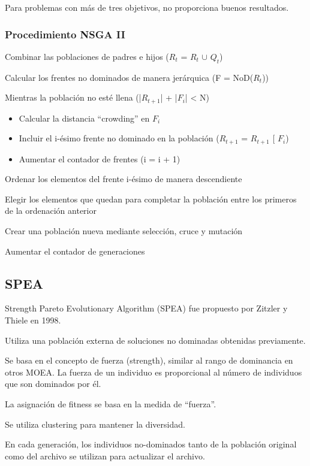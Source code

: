 \documentclass[12pt, twoside, openright]{report} %
\begin{document}
Para problemas con más de tres objetivos, no proporciona buenos resultados.

\subsubsection{Procedimiento NSGA II}
Combinar las poblaciones de padres e hijos ($R_t$ = $R_t$ $\cup$ $Q_t$)

Calcular los frentes no dominados de manera jerárquica (F = NoD($R_t$))

Mientras la población no esté llena (|$R_{t+1}$| + |$F_i$| < N)
\begin{itemize}
	\item Calcular la distancia “crowding” en $F_i$
	\item Incluir el i-ésimo frente no dominado en la población ($R_{t+1}$ = $R_{t+1}$ [ $F_i$)
	\item Aumentar el contador de frentes (i = i + 1)
\end{itemize}

Ordenar los elementos del frente i-ésimo de manera descendiente

Elegir los elementos que quedan para completar la población entre los primeros de la ordenación anterior

Crear una población nueva mediante selección, cruce y mutación

Aumentar el contador de generaciones
\pagebreak
\subsection{SPEA}
Strength Pareto Evolutionary Algorithm (SPEA) fue propuesto por Zitzler y Thiele en 1998.

Utiliza una población externa de soluciones no dominadas obtenidas previamente.

Se basa en el concepto de fuerza (strength), similar al rango de dominancia en otros MOEA. La fuerza de un individuo es proporcional al número de individuos que son dominados por él.

La asignación de fitness se basa en la medida de “fuerza”.

Se utiliza clustering para mantener la diversidad.

En cada generación, los individuos no-dominados tanto de la población original como del archivo se utilizan para actualizar el archivo.
\end{document}
